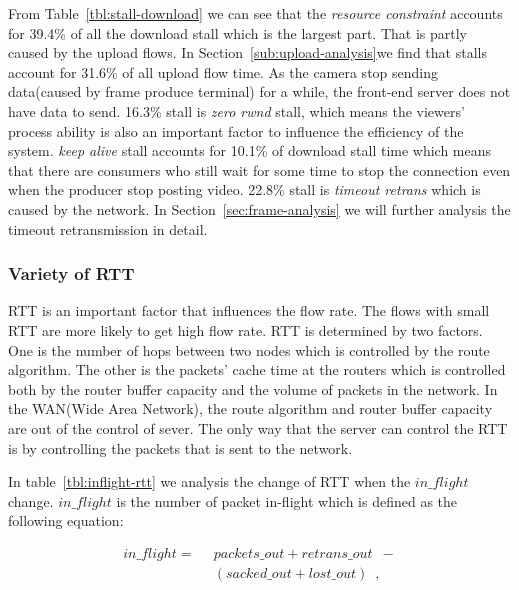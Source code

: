 From Table~\ref{tbl:stall-download} we can see that the \emph{resource constraint} accounts for 39.4\% of all the download stall which is the largest part. That is partly caused by the upload flows. In Section~\ref{sub:upload-analysis}we find that stalls account for 31.6\% of all upload flow time. As the camera stop sending data(caused by frame produce terminal) for a while, the front-end server does not have data to send. 16.3\% stall is \emph{zero rwnd} stall, which means the viewers' process ability is also an important factor to influence the efficiency of the system. \emph{keep alive} stall accounts for 10.1\% of download stall time which means that there are consumers who still wait for some time to stop the connection even when the producer stop posting video. 22.8\% stall is \emph{timeout retrans} which is caused by the network. In Section~\ref{sec:frame-analysis} we will further analysis the timeout retransmission in detail.

\subsubsection{Variety of RTT}
\label{sub:RTT}

RTT is an important factor that influences the flow rate. The flows with small RTT are more likely to get high flow rate. RTT is determined by two factors. One is the number of hops between two nodes which is controlled by the route algorithm. The other is the packets' cache time at the routers which is controlled both by the router buffer capacity and the volume of packets in the network. In the WAN(Wide Area Network), the route algorithm and router buffer capacity are out of the control of sever. The only way that the server can control the RTT is by controlling the packets that is sent to the network.

In table~\ref{tbl:inflight-rtt} we analysis the change of RTT when the $in\_flight$ change. $in\_flight$ is the number of packet in-flight which is defined as the following equation:

\begin{footnotesize}
 \begin{equation}
\label{eq:conserve}
\begin{aligned}
in\_flight = \enspace & packets\_out + retrans\_out \enspace - \\
& (sacked\_out + lost\_out) \enspace ,
\end{aligned}
\end{equation}
\end{footnotesize}

